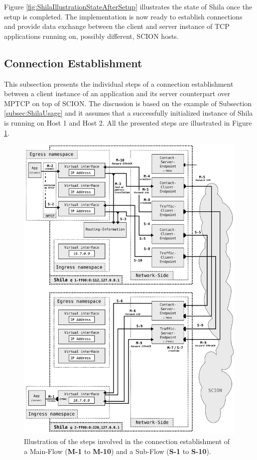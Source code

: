 Figure \ref{fig:ShilaIllustrationStateAfterSetup} illustrates the state of Shila once the setup is completed. The implementation is now ready to establish connections and provide data exchange between the client and server instance of TCP applications running on, possibly different, SCION hosts. 

\subsection{Connection Establishment}
\label{subsec:ShilaConnectionEstablishment}

This subsection presents the individual steps of a connection establishment between a client instance of an application and its server counterpart over MPTCP on top of SCION. The discussion is based on the example of Subsection \ref{subsec:ShilaUsage} and it assumes that a successfully initialized instance of Shila is running on Host 1 and Host 2. All the presented steps are illustrated in Figure \ref{fig:ShilaIllustrationConnectionEstablishment}. 

\begin{figure}
	\begin{center}
		\def\svgwidth{1\textwidth}
		\includegraphics[scale=0.2]{../illustrations/shilaIntroduction/ConnectionEstablishment.pdf}   
		\caption[Caption for the list of figures.]{Illustration of the steps involved in the connection establishment of a Main-Flow (\textbf{M-1} to \textbf{M-10}) and a Sub-Flow (\textbf{S-1} to \textbf{S-10}).}
		\label{fig:ShilaIllustrationConnectionEstablishment}
	\end{center}
\end{figure}

